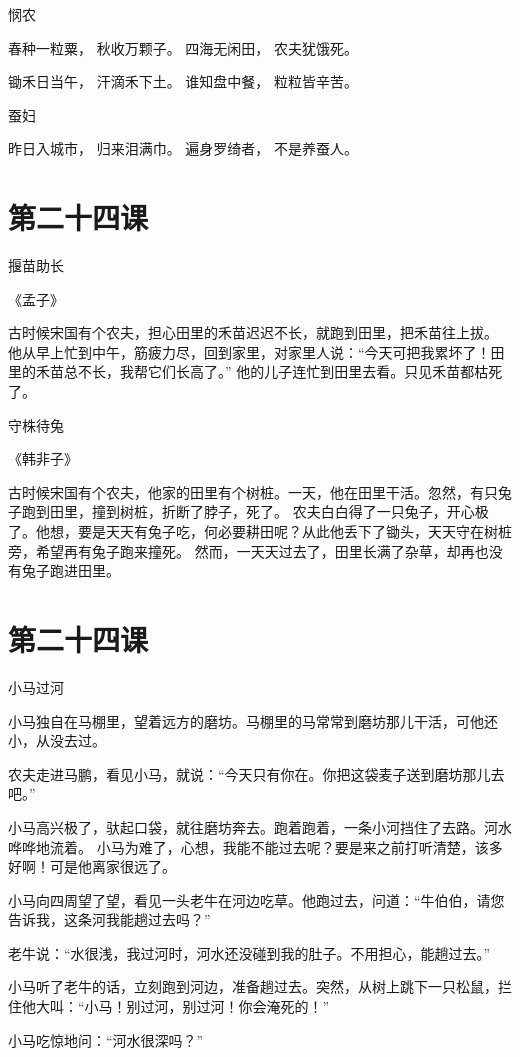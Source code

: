 \documentclass[12pt,UTF8]{ctexbook}
\begin{document}
悯农

春种一粒粟，
秋收万颗子。
四海无闲田，
农夫犹饿死。

锄禾日当午，
汗滴禾下土。
谁知盘中餐，
粒粒皆辛苦。

蚕妇

昨日入城市，
归来泪满巾。
遍身罗绮者，
不是养蚕人。

\section{第二十四课}

揠苗助长

《孟子》

古时候宋国有个农夫，担心田里的禾苗迟迟不长，就跑到田里，把禾苗往上拔。
他从早上忙到中午，筋疲力尽，回到家里，对家里人说：“今天可把我累坏了！田里的禾苗总不长，我帮它们长高了。”
他的儿子连忙到田里去看。只见禾苗都枯死了。

守株待兔

《韩非子》

古时候宋国有个农夫，他家的田里有个树桩。一天，他在田里干活。忽然，有只兔子跑到田里，撞到树桩，折断了脖子，死了。
农夫白白得了一只兔子，开心极了。他想，要是天天有兔子吃，何必要耕田呢？从此他丢下了锄头，天天守在树桩旁，希望再有兔子跑来撞死。
然而，一天天过去了，田里长满了杂草，却再也没有兔子跑进田里。

\section{第二十四课}

小马过河

小马独自在马棚里，望着远方的磨坊。马棚里的马常常到磨坊那儿干活，可他还小，从没去过。

农夫走进马鹏，看见小马，就说：“今天只有你在。你把这袋麦子送到磨坊那儿去吧。”

小马高兴极了，驮起口袋，就往磨坊奔去。跑着跑着，一条小河挡住了去路。河水哗哗地流着。
小马为难了，心想，我能不能过去呢？要是来之前打听清楚，该多好啊！可是他离家很远了。

小马向四周望了望，看见一头老牛在河边吃草。他跑过去，问道：“牛伯伯，请您告诉我，这条河我能趟过去吗？”

老牛说：“水很浅，我过河时，河水还没碰到我的肚子。不用担心，能趟过去。”

小马听了老牛的话，立刻跑到河边，准备趟过去。突然，从树上跳下一只松鼠，拦住他大叫：“小马！别过河，别过河！你会淹死的！”

小马吃惊地问：“河水很深吗？”
\end{document}
